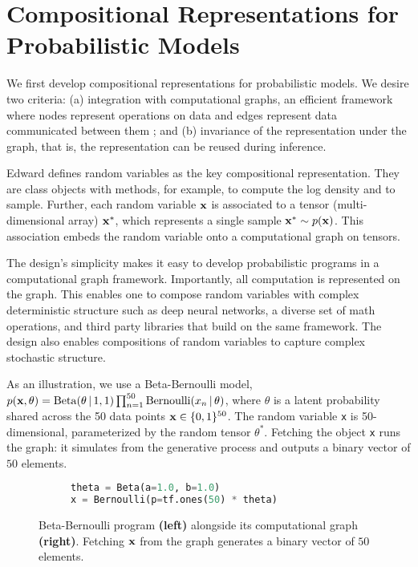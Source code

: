 \vspace{-0.5ex}
\section{Compositional Representations for Probabilistic Models}
\label{sec:modeling_language}
\vspace{-0.5ex}

We first develop compositional representations for probabilistic
models. We desire two criteria: (a) integration with computational
graphs, an efficient
framework where nodes represent operations on data and edges
represent data communicated between them
\citep{culler1986dataflow}; and (b)
invariance of the representation under the graph, that is, the
representation can be
reused during inference.

Edward defines random variables as the key compositional representation.
They are class objects with methods, for example, to compute the log
density and to sample. Further, each random variable $\boldsymbol{\mathbf{x}}$ is
associated to a tensor (multi-dimensional array) $\boldsymbol{\mathbf{x}}^*$, which
represents a single sample $\boldsymbol{\mathbf{x}}^*\sim p(\boldsymbol{\mathbf{x}})$. This association
embeds the random variable onto a computational graph on tensors.

The design's simplicity makes it easy to develop probabilistic programs in a
computational graph framework. Importantly, all computation is
represented on the graph. This enables one to compose random
variables with complex deterministic structure such as deep neural
networks, a diverse set of math operations, and third party libraries
that build on the same framework. The design also enables compositions
of random variables to capture complex stochastic structure.

As an illustration, we use a Beta-Bernoulli model,
$p(\boldsymbol{\mathbf{x}}, \theta) = \operatorname{Beta}(\theta\,|\, 1, 1) \prod_{n=1}^{50}
\operatorname{Bernoulli}(x_n\,|\, \theta)$, where $\theta$ is a latent
probability shared across the 50 data points $\boldsymbol{\mathbf{x}}\in\{0,1\}^{50}$.
The random variable \texttt{x} is 50-dimensional, parameterized by the
random tensor $\theta^*$. Fetching the object \texttt{x} runs the
graph: it simulates from the generative process and outputs a binary
vector of $50$ elements.

\begin{figure}[!htb]
\begin{subfigure}{0.3\columnwidth}
  \centering
\begin{lstlisting}[language=python]
theta = Beta(a=1.0, b=1.0)
x = Bernoulli(p=tf.ones(50) * theta)
\end{lstlisting}
\end{subfigure}%
\begin{subfigure}{0.65\columnwidth}
  \centering
  
\end{subfigure}
\caption{Beta-Bernoulli program \textbf{(left)} alongside its
computational graph \textbf{(right)}.
Fetching $\boldsymbol{\mathbf{x}}$ from the graph generates a binary vector of $50$ elements.
}
\label{fig:beta_bernoulli}
\end{figure}

